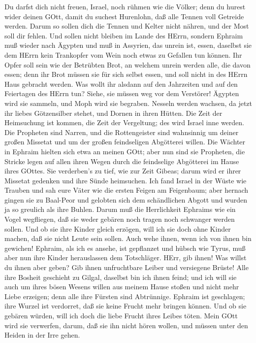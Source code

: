  Du darfst dich nicht freuen, Israel, noch rühmen wie die
Völker; denn du hurest wider deinen GOtt, damit du suchest Hurenlohn,
daß alle Tennen voll Getreide werden.  Darum so sollen dich
die Tennen und Kelter nicht nähren, und der Most soll dir fehlen.
 Und sollen nicht bleiben im Lande des HErrn, sondern
Ephraim muß wieder nach Ägypten und muß in Assyrien, das unrein ist,
essen,  daselbst sie dem HErrn kein Trankopfer vom Wein noch
etwas zu Gefallen tun können. Ihr Opfer soll sein wie der Betrübten
Brot, an welchem unrein werden alle, die davon essen; denn ihr Brot
müssen sie für sich selbst essen, und soll nicht in des HErrn Haus
gebracht werden.  Was wollt ihr alsdann auf den Jahrzeiten
und auf den Feiertagen des HErrn tun?  Siehe, sie müssen weg
vor dem Verstörer! Ägypten wird sie sammeln, und Moph wird sie begraben.
Nesseln werden wachsen, da jetzt ihr liebes Götzensilber stehet, und
Dornen in ihren Hütten.  Die Zeit der Heimsuchung ist
kommen, die Zeit der Vergeltung; des wird Israel inne werden. Die
Propheten sind Narren, und die Rottengeister sind wahnsinnig um deiner
großen Missetat und um der großen feindseligen Abgötterei willen.
 Die Wächter in Ephraim hielten sich etwa an meinen GOtt;
aber nun sind sie Propheten, die Stricke legen auf allen ihren Wegen
durch die feindselige Abgötterei im Hause ihres GOttes.  Sie
verderben's zu tief, wie zur Zeit Gibeas; darum wird er ihrer Missetat
gedenken und ihre Sünde heimsuchen.  Ich fand Israel in der
Wüste wie Trauben und sah eure Väter wie die ersten Feigen am
Feigenbaum; aber hernach gingen sie zu Baal-Peor und gelobten sich dem
schändlichen Abgott und wurden ja so greulich als ihre Buhlen.
 Darum muß die Herrlichkeit Ephraims wie ein Vogel
wegfliegen, daß sie weder gebären noch tragen noch schwanger werden
sollen.  Und ob sie ihre Kinder gleich erzögen, will ich
sie doch ohne Kinder machen, daß sie nicht Leute sein sollen. Auch wehe
ihnen, wenn ich von ihnen bin gewichen!  Ephraim, als ich
es ansehe, ist gepflanzet und hübsch wie Tyrus, muß aber nun ihre Kinder
herauslassen dem Totschläger.  HErr, gib ihnen! Was willst
du ihnen aber geben? Gib ihnen unfruchtbare Leiber und versiegene
Brüste!  Alle ihre Bosheit geschieht zu Gilgal, daselbst
bin ich ihnen feind; und ich will sie auch um ihres bösen Wesens willen
aus meinem Hause stoßen und nicht mehr Liebe erzeigen; denn alle ihre
Fürsten sind Abtrünnige.  Ephraim ist geschlagen; ihre
Wurzel ist verdorret, daß sie keine Frucht mehr bringen können. Und ob
sie gebären würden, will ich doch die liebe Frucht ihres Leibes töten.
 Mein GOtt wird sie verwerfen, darum, daß sie ihn nicht
hören wollen, und müssen unter den Heiden in der Irre gehen.

